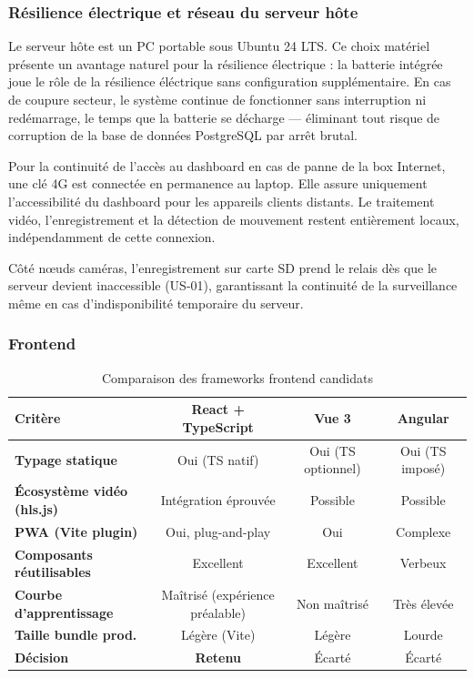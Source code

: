 \documentclass[12pt,a4paper]{article}
\begin{document}
\subsubsection{Résilience électrique et réseau du serveur hôte}

Le serveur hôte est un PC portable sous Ubuntu 24 LTS. Ce choix matériel présente un avantage naturel pour la résilience électrique : la batterie intégrée joue le rôle de la résilience éléctrique sans configuration supplémentaire. En cas de coupure secteur, le système continue de fonctionner sans interruption ni redémarrage, le temps que la batterie se décharge — éliminant tout risque de corruption de la base de données PostgreSQL par arrêt brutal.

Pour la continuité de l'accès au dashboard en cas de panne de la box Internet, une clé 4G est connectée en permanence au laptop. Elle assure uniquement l'accessibilité du dashboard pour les appareils clients distants. Le traitement vidéo, l'enregistrement et la détection de mouvement restent entièrement locaux, indépendamment de cette connexion.

Côté nœuds caméras, l'enregistrement sur carte SD prend le relais dès que le serveur devient inaccessible (US-01), garantissant la continuité de la surveillance même en cas d'indisponibilité temporaire du serveur.

\subsubsection{Frontend}

\begin{table}[H]
\centering
\small
\renewcommand{\arraystretch}{1.3}
\begin{tabular}{|l|c|c|c|}
\hline
\textbf{Critère} & \textbf{React + TypeScript} & \textbf{Vue 3} & \textbf{Angular} \\
\hline
\textbf{Typage statique} & Oui (TS natif) & Oui (TS optionnel) & Oui (TS imposé) \\
\hline
\textbf{Écosystème vidéo (hls.js)} & Intégration éprouvée & Possible & Possible \\
\hline
\textbf{PWA (Vite plugin)} & Oui, plug-and-play & Oui & Complexe \\
\hline
\textbf{Composants réutilisables} & Excellent & Excellent & Verbeux \\
\hline
\textbf{Courbe d'apprentissage} & Maîtrisé (expérience préalable) & Non maîtrisé & Très élevée \\
\hline
\textbf{Taille bundle prod.} & Légère (Vite) & Légère & Lourde \\
\hline
\textbf{Décision} & \textcolor{green!60!black}{\textbf{Retenu}} & Écarté & Écarté \\
\hline
\end{tabular}
\caption{Comparaison des frameworks frontend candidats}
\end{table}
\end{document}
